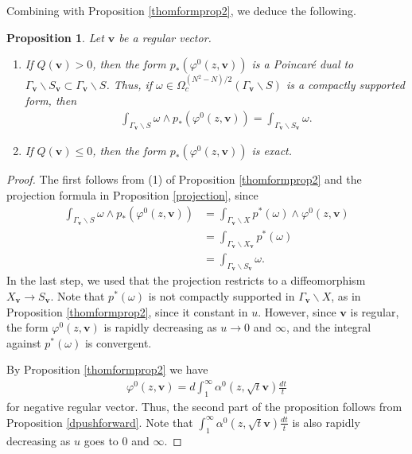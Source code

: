 \documentclass[a4paper,11pt]{amsart} %
\newcommand{\8}{\infty}
\newcommand{\vbf}{\mathbf{v}}
\theoremstyle{mytheoremstyle}
\newtheorem{prop}[thm]{Proposition}
\theoremstyle{remark}
\numberwithin{equation}{section}
\begin{document}
Combining with Proposition \ref{thomformprop2}, we deduce the following.
\begin{prop} \label{thomformprop3} Let $\vbf$ be a regular vector. 
\begin{enumerate} \item  If $Q(\vbf)>0$, then the form $p_\ast(\varphi^0(z,\vbf))$ is a Poincaré dual to $\Gamma_\vbf \backslash S_\vbf \subset \Gamma_\vbf \backslash S$. Thus, if $\omega \in \Omega_c^{(N^2-N)/2}(\Gamma_\vbf \backslash S)$ is a compactly supported form, then
\begin{align} 
\int_{\Gamma_\vbf \backslash S} \omega \wedge p_\ast(\varphi^0(z,\vbf))=\int_{\Gamma_\vbf \backslash S_\vbf} \omega.
\end{align}
\item  If $Q(\vbf) \leq 0$, then the form $p_\ast \left ( \varphi^0(z,\vbf) \right )$ is exact.
\end{enumerate}
\end{prop}
\begin{proof}
The first follows from (1) of Proposition \ref{thomformprop2} and the projection formula in Proposition \ref{projection}, since
\begin{align} 
\int_{\Gamma_\vbf \backslash S} \omega \wedge p_\ast(\varphi^0(z,\vbf)) & = \int_{\Gamma_\vbf \backslash X} p^\ast (\omega) \wedge \varphi^0(z,\vbf) \\
&=\int_{\Gamma_\vbf \backslash X_\vbf} p^\ast (\omega) \\
&=\int_{\Gamma_\vbf \backslash S_\vbf} \omega.
\end{align}
In the last step, we used that the projection restricts to a diffeomorphism $X_\vbf \longrightarrow S_\vbf$. Note that $p^\ast (\omega)$ is not compactly supported in $\Gamma_\vbf \backslash X$, as in Proposition \ref{thomformprop2}, since it constant in $u$. However, since $\vbf$ is regular, the form $\varphi^0(z,\vbf)$ is rapidly decreasing as $u \rightarrow 0$ and $\8$, and the integral against $p^\ast (\omega)$ is convergent.

By Proposition \ref{thomformprop2} we have \begin{align}
\varphi^0(z,\vbf)=d\int_1^\8 \alpha^{0}(z,\sqrt{t}\vbf) \frac{dt}{t}
\end{align}
for negative regular vector. Thus, the second part of the proposition follows from Proposition \ref{dpushforward}. Note that $\int_1^\8 \alpha^{0}(z,\sqrt{t}\vbf) \frac{dt}{t}$ is also rapidly decreasing as $u$ goes to $0$ and $\8$.
\end{proof}
\end{document}
